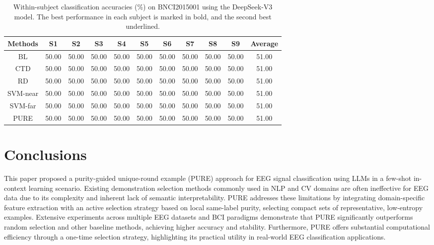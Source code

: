 \documentclass[journal,twocolumn]{IEEEtran}
\begin{document}
\begin{table}[htpb] \centering
  \caption{Within-subject classification accuracies (\%) on BNCI2015001 using the DeepSeek-V3 model. The best performance in each subject is marked in bold, and the second best underlined.}
  \label{tab:deepseek-result}
  \begin{tabular}{c|c|c|c|c|c|c|c|c|c|c}
  \toprule
  Methods & S1 & S2 & S3 & S4 & S5 & S6 & S7 & S8 & S9 & Average \\
  \midrule
  BL & 50.00 & 50.00 & 50.00 & 50.00 & 50.00 & 50.00 & 50.00 & 50.00 & 50.00 & 51.00 \\
  CTD & 50.00 & 50.00 & 50.00 & 50.00 & 50.00 & 50.00 & 50.00 & 50.00 & 50.00 & 51.00 \\
  RD & 50.00 & 50.00 & 50.00 & 50.00 & 50.00 & 50.00 & 50.00 & 50.00 & 50.00 & 51.00 \\
  SVM-near & 50.00 & 50.00 & 50.00 & 50.00 & 50.00 & 50.00 & 50.00 & 50.00 & 50.00 & 51.00 \\
  SVM-far & 50.00 & 50.00 & 50.00 & 50.00 & 50.00 & 50.00 & 50.00 & 50.00 & 50.00 & 51.00 \\
  PURE & 50.00 & 50.00 & 50.00 & 50.00 & 50.00 & 50.00 & 50.00 & 50.00 & 50.00 & 51.00 \\
  \bottomrule
  \end{tabular}
\end{table}

\section{Conclusions}
\label{sec:conclusion}
This paper proposed a purity-guided unique-round example (PURE) approach for EEG signal classification using LLMs in a few-shot in-context learning scenario. Existing demonstration selection methods commonly used in NLP and CV domains are often ineffective for EEG data due to its complexity and inherent lack of semantic interpretability. PURE addresses these limitations by integrating domain-specific feature extraction with an active selection strategy based on local same-label purity, selecting compact sets of representative, low-entropy examples. Extensive experiments across multiple EEG datasets and BCI paradigms demonstrate that PURE significantly outperforms random selection and other baseline methods, achieving higher accuracy and stability. Furthermore, PURE offers substantial computational efficiency through a one-time selection strategy, highlighting its practical utility in real-world EEG classification applications.
\end{document}
